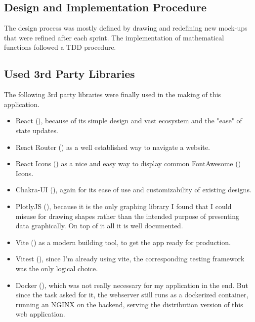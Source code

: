 \blankpage
\newpage
\subsection{Design and Implementation Procedure}
The design process was mostly defined by drawing and redefining new mock-ups that were refined after each sprint. The implementation of mathematical functions followed a \ac{TDD} procedure.

\subsection{Used 3rd Party Libraries}
The following 3rd party libraries were finally used in the making of this application.
\begin{itemize}
  \item React (\cite{React}), because of its simple design and vast ecosystem and the "ease" of state updates.
  \item React Router (\cite{ReactRouter}) as a well established way to navigate a website. 
  \item React Icons (\cite{ReactIcons}) as a nice and easy way to display common FontAwesome (\cite{FA}) Icons.
  \item Chakra-UI (\cite{chakra}), again for its ease of use and customizability of existing designs.
  \item PlotlyJS (\cite{PlotlyJS}), because it is the only graphing library I found that I could misuse for drawing shapes rather than the intended purpose of presenting data graphically. On top of it all it is well documented.
  \item Vite (\cite{Vite}) as a modern building tool, to get the app ready for production.
  \item Vitest (\cite{Vitest}), since I'm already using vite, the corresponding testing framework was the only logical choice.
  \item Docker (\cite{Docker}), which was not really necessary for my application in the end. But since the task asked for it, the webserver still runs as a dockerized container, running an NGINX \cite{NGINX} on the backend, serving the distribution version of this web application.
\end{itemize}